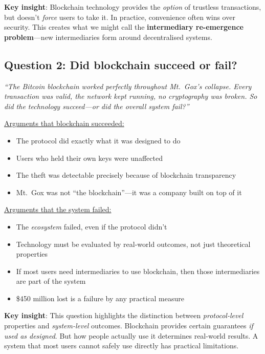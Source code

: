 \documentclass[11pt]{article}
\begin{document}
\medskip
\noindent\textbf{Key insight}: Blockchain technology provides the \textit{option} of trustless transactions, but doesn't \textit{force} users to take it. In practice, convenience often wins over security. This creates what we might call the \textbf{intermediary re-emergence problem}---new intermediaries form around decentralised systems.

\subsection*{Question 2: Did blockchain succeed or fail?}

\textit{``The Bitcoin blockchain worked perfectly throughout Mt.\ Gox's collapse. Every transaction was valid, the network kept running, no cryptography was broken. So did the technology succeed---or did the overall system fail?''}

\medskip
\noindent\underline{Arguments that blockchain succeeded:}
\begin{itemize}[leftmargin=*]
\item The protocol did exactly what it was designed to do
\item Users who held their own keys were unaffected
\item The theft was detectable precisely because of blockchain transparency
\item Mt.\ Gox was not ``the blockchain''---it was a company built on top of it
\end{itemize}

\medskip
\noindent\underline{Arguments that the system failed:}
\begin{itemize}[leftmargin=*]
\item The \textit{ecosystem} failed, even if the protocol didn't
\item Technology must be evaluated by real-world outcomes, not just theoretical properties
\item If most users need intermediaries to use blockchain, then those intermediaries are part of the system
\item \$450 million lost is a failure by any practical measure
\end{itemize}

\medskip
\noindent\textbf{Key insight}: This question highlights the distinction between \textit{protocol-level} properties and \textit{system-level} outcomes. Blockchain provides certain guarantees \textit{if used as designed}. But how people actually use it determines real-world results. A system that most users cannot safely use directly has practical limitations.
\end{document}
